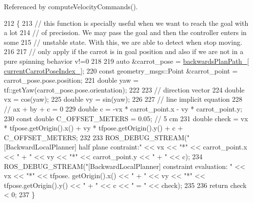 Referenced by compute\+Velocity\+Commands().


\begin{DoxyCode}
212         \{
213             \textcolor{comment}{// this function is specially useful when we want to reach the goal with a lot}
214             \textcolor{comment}{// of precission. We may pass the goal and then the controller enters in some}
215             \textcolor{comment}{// unstable state. With this, we are able to detect when stop moving.}
216 
217             \textcolor{comment}{// only apply if the carrot is in goal position and also if we are not in a pure spinning
       behavior v!=0}
218 
219             \textcolor{keyword}{auto} &carrot\_pose = \hyperlink{classcl__move__base__z_1_1backward__local__planner_1_1BackwardLocalPlanner_ad9cde5c85f782cab2ddb4030e3c3f2cf}{backwardsPlanPath\_}[
      \hyperlink{classcl__move__base__z_1_1backward__local__planner_1_1BackwardLocalPlanner_a2e8f2b78bc97f27c5fa431f3af2261ed}{currentCarrotPoseIndex\_}];
220             \textcolor{keyword}{const} geometry\_msgs::Point &carrot\_point = carrot\_pose.pose.position;
221             \textcolor{keywordtype}{double} yaw = tf::getYaw(carrot\_pose.pose.orientation);
222 
223             \textcolor{comment}{// direction vector}
224             \textcolor{keywordtype}{double} vx = cos(yaw);
225             \textcolor{keywordtype}{double} vy = sin(yaw);
226 
227             \textcolor{comment}{// line implicit equation}
228             \textcolor{comment}{// ax + by + c = 0}
229             \textcolor{keywordtype}{double} c = -vx * carrot\_point.x - vy * carrot\_point.y;
230             \textcolor{keyword}{const} \textcolor{keywordtype}{double} C\_OFFSET\_METERS = 0.05; \textcolor{comment}{// 5 cm}
231             \textcolor{keywordtype}{double} check = vx * tfpose.getOrigin().x() + vy * tfpose.getOrigin().y() + c + C\_OFFSET\_METERS;
232 
233             ROS\_DEBUG\_STREAM(\textcolor{stringliteral}{"[BackwardLocalPlanner] half plane contraint:"} << vx << \textcolor{stringliteral}{"*"} << carrot\_point.x 
      << \textcolor{stringliteral}{" + "} << vy << \textcolor{stringliteral}{"*"} << carrot\_point.y << \textcolor{stringliteral}{" + "} << c);
234             ROS\_DEBUG\_STREAM(\textcolor{stringliteral}{"[BackwardLocalPlanner] constraint evaluation: "} << vx << \textcolor{stringliteral}{"*"} << tfpose.
      getOrigin().x() << \textcolor{stringliteral}{" + "} << vy << \textcolor{stringliteral}{"*"} << tfpose.getOrigin().y() << \textcolor{stringliteral}{" + "} << c << \textcolor{stringliteral}{" = "} << check);
235 
236             \textcolor{keywordflow}{return} check < 0;
237         \}
\end{DoxyCode}
